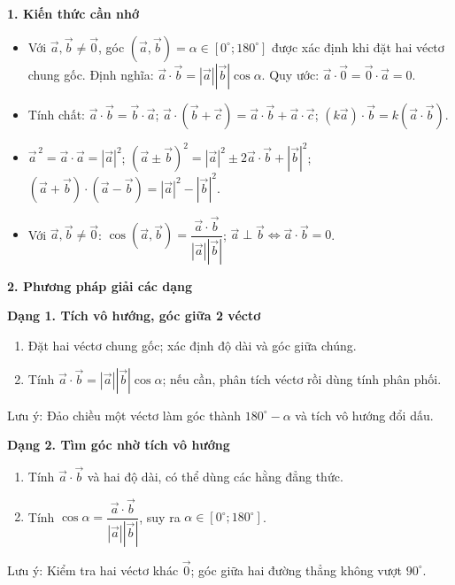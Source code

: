 \textbf{1. Kiến thức cần nhớ}
\begin{itemize}
\item Với $\overrightarrow{a},\overrightarrow{b}\ne\overrightarrow{0}$, góc $(\overrightarrow{a},\overrightarrow{b})=\alpha\in[0^\circ;180^\circ]$ được xác định khi đặt hai véctơ chung gốc. Định nghĩa: $\boxed{\overrightarrow{a}\cdot\overrightarrow{b}=|\overrightarrow{a}||\overrightarrow{b}|\cos\alpha}$. Quy ước: $\overrightarrow{a}\cdot\overrightarrow{0}=\overrightarrow{0}\cdot\overrightarrow{a}=0$.
\item Tính chất: $\overrightarrow{a}\cdot\overrightarrow{b}=\overrightarrow{b}\cdot\overrightarrow{a}$; $\overrightarrow{a}\cdot(\overrightarrow{b}+\overrightarrow{c})=\overrightarrow{a}\cdot\overrightarrow{b}+\overrightarrow{a}\cdot\overrightarrow{c}$; $(k\overrightarrow{a})\cdot\overrightarrow{b}=k(\overrightarrow{a}\cdot\overrightarrow{b})$.
\item $\overrightarrow{a}^{\,2}=\overrightarrow{a}\cdot\overrightarrow{a}=|\overrightarrow{a}|^2$; $(\overrightarrow{a}\pm\overrightarrow{b})^2=|\overrightarrow{a}|^2\pm2\overrightarrow{a}\cdot\overrightarrow{b}+|\overrightarrow{b}|^2$; $(\overrightarrow{a}+\overrightarrow{b})\cdot(\overrightarrow{a}-\overrightarrow{b})=|\overrightarrow{a}|^2-|\overrightarrow{b}|^2$.
\item Với $\overrightarrow{a},\overrightarrow{b}\ne\overrightarrow{0}$: $\boxed{\cos(\overrightarrow{a},\overrightarrow{b})=\dfrac{\overrightarrow{a}\cdot\overrightarrow{b}}{|\overrightarrow{a}||\overrightarrow{b}|}}$; $\boxed{\overrightarrow{a}\perp\overrightarrow{b}\iff\overrightarrow{a}\cdot\overrightarrow{b}=0}$.
\end{itemize}

\textbf{2. Phương pháp giải các dạng}

\textbf{Dạng 1. Tích vô hướng, góc giữa 2 véctơ}
\begin{enumerate}
\item Đặt hai véctơ chung gốc; xác định độ dài và góc giữa chúng.
\item Tính $\overrightarrow{a}\cdot\overrightarrow{b}=|\overrightarrow{a}||\overrightarrow{b}|\cos\alpha$; nếu cần, phân tích véctơ rồi dùng tính phân phối.
\end{enumerate}
Lưu ý: Đảo chiều một véctơ làm góc thành $180^\circ-\alpha$ và tích vô hướng đổi dấu.

\textbf{Dạng 2. Tìm góc nhờ tích vô hướng}
\begin{enumerate}
\item Tính $\overrightarrow{a}\cdot\overrightarrow{b}$ và hai độ dài, có thể dùng các hằng đẳng thức.
\item Tính $\cos\alpha=\dfrac{\overrightarrow{a}\cdot\overrightarrow{b}}{|\overrightarrow{a}||\overrightarrow{b}|}$, suy ra $\alpha\in[0^\circ;180^\circ]$.
\end{enumerate}
Lưu ý: Kiểm tra hai véctơ khác $\overrightarrow{0}$; góc giữa hai đường thẳng không vượt $90^\circ$.

